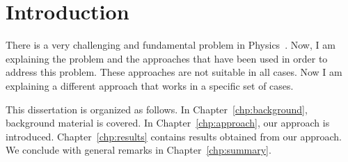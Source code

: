%
%
%

\chapter{Introduction}
\label{chp:Intro}

There is a very challenging and fundamental problem in Physics~\cite{fakeCite}.
Now, I am explaining the problem and the approaches that have been used in order to address this problem.
These approaches are not suitable in all cases.
Now I am explaining a different approach that works in a specific set of cases.

This dissertation is organized as follows.
In Chapter~\ref{chp:background}, background material is covered.
In Chapter~\ref{chp:approach}, our approach is introduced.
Chapter~\ref{chp:results} contains results obtained from our approach.
We conclude with general remarks in Chapter~\ref{chp:summary}.